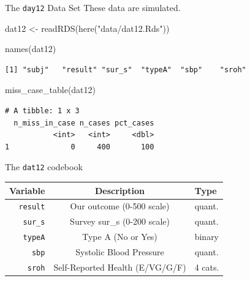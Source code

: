 \documentclass[
  ignorenonframetext,
]{beamer}
\newenvironment{Shaded}{\begin{snugshade}}{\end{snugshade}}
\newcommand{\FunctionTok}[1]{\textcolor[rgb]{0.00,0.00,0.00}{#1}}
\newcommand{\NormalTok}[1]{#1}
\newcommand{\OtherTok}[1]{\textcolor[rgb]{0.56,0.35,0.01}{#1}}
\newcommand{\StringTok}[1]{\textcolor[rgb]{0.31,0.60,0.02}{#1}}
\begin{document}
\begin{frame}[fragile]{The \texttt{day12} Data Set}
\protect\hypertarget{the-day12-data-set}{}
These data are simulated.

\begin{Shaded}
\begin{Highlighting}[]
\NormalTok{dat12 }\OtherTok{\textless{}{-}} \FunctionTok{readRDS}\NormalTok{(}\FunctionTok{here}\NormalTok{(}\StringTok{"data/dat12.Rds"}\NormalTok{))}

\FunctionTok{names}\NormalTok{(dat12)}
\end{Highlighting}
\end{Shaded}

\begin{verbatim}
[1] "subj"   "result" "sur_s"  "typeA"  "sbp"    "sroh"  
\end{verbatim}

\begin{Shaded}
\begin{Highlighting}[]
\FunctionTok{miss\_case\_table}\NormalTok{(dat12)}
\end{Highlighting}
\end{Shaded}

\begin{verbatim}
# A tibble: 1 x 3
  n_miss_in_case n_cases pct_cases
           <int>   <int>     <dbl>
1              0     400       100
\end{verbatim}
\end{frame}

\begin{frame}[fragile]{The \texttt{dat12} codebook}
\protect\hypertarget{the-dat12-codebook}{}
\begin{longtable}[]{@{}rcl@{}}
\toprule
Variable & Description & Type \\
\midrule
\endhead
\texttt{result} & Our outcome (0-500 scale) & quant. \\
\texttt{sur\_s} & Survey sur\_s (0-200 scale) & quant. \\
\texttt{typeA} & Type A (No or Yes) & binary \\
\texttt{sbp} & Systolic Blood Pressure & quant. \\
\texttt{sroh} & Self-Reported Health (E/VG/G/F) & 4 cats. \\
\bottomrule
\end{longtable}
\end{frame}
\end{document}
